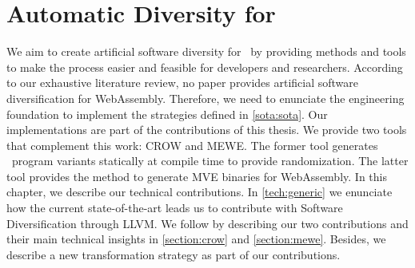 \chapter{Automatic Diversity for \wasm}
\label{chapter:technical}


We aim to create artificial software diversity for \wasm\ by providing methods and tools to make the process easier and feasible for developers and researchers. According to our exhaustive literature review, no paper provides artificial software diversification for WebAssembly. Therefore, we need to enunciate the engineering foundation to implement the strategies defined in \autoref{sota:sota}. Our implementations are part of the contributions of this thesis. We provide two tools that complement this work: CROW and MEWE. The former tool generates \wasm\ program variants statically at compile time to provide randomization. The latter tool provides the method to generate MVE binaries for WebAssembly.
In this chapter, we describe our technical contributions. In \autoref{tech:generic} we enunciate how the current state-of-the-art leads us to contribute with Software Diversification through LLVM. We follow by describing our two contributions and their main technical insights in \autoref{section:crow} and \autoref{section:mewe}. Besides, we describe a new transformation strategy as part of our contributions. 















